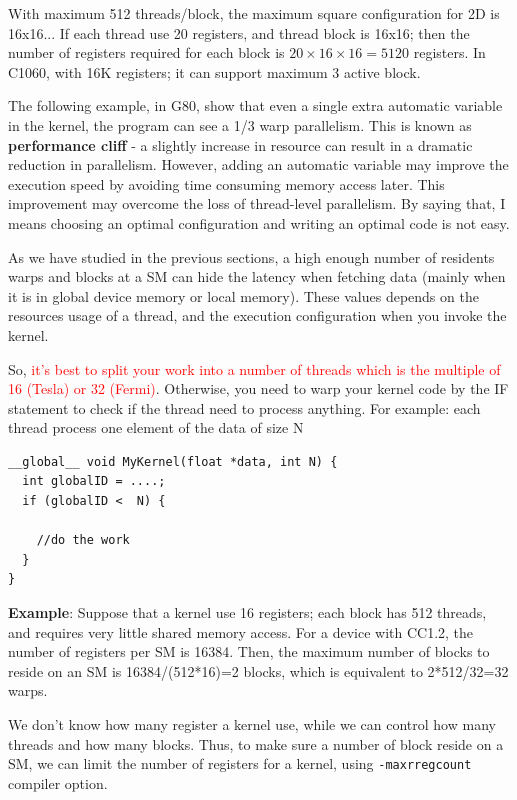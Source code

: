 \begin{framed}
  With maximum 512 threads/block, the maximum square configuration for
  2D is 16x16... If each thread use 20 registers, and thread block is
  16x16; then the number of registers required for each block is
  $20\times 16\times 16=5120$ registers. In C1060, with 16K registers;
  it can support maximum 3 active block.
\end{framed}

The following example, in G80, show that even a single extra automatic
variable in the kernel, the program can see a 1/3 warp
parallelism. This is known as {\bf performance cliff} - a slightly
increase in resource can result in a dramatic reduction in
parallelism. However, adding an automatic variable may improve the
execution speed by avoiding time consuming memory access later. This
improvement may overcome the loss of thread-level parallelism. By
saying that, I means choosing an optimal configuration and writing an
optimal code is not easy. 

As we have studied in the previous sections, a high enough number of
residents warps and blocks at a SM can hide the latency when fetching
data (mainly when it is in global device memory or local memory).
These values depends on the resources usage of a thread, and the
execution configuration when you invoke the kernel.


So,
\textcolor{red}{it's best to split your work into a number of threads
  which is the multiple of 16 (Tesla) or 32 (Fermi)}.
Otherwise, you need to warp your kernel code by the IF statement to
check if the thread need to process anything. For example: each thread
process one element of the data of size N
\begin{lstlisting}
__global__ void MyKernel(float *data, int N) {
  int globalID = ....;
  if (globalID <  N) {

    //do the work
  }
}
\end{lstlisting}

{\bf Example}: Suppose that a kernel use 16 registers; each block has
512 threads, and requires very little shared memory access. For a
device with CC1.2, the number of registers per SM is 16384. Then, the
maximum number of blocks to reside on an SM is 16384/(512*16)=2
blocks, which is equivalent to 2*512/32=32 warps.

We don't know how many register a kernel use, while we can control how
many threads and how many blocks. Thus, to make sure a number of block
reside on a SM, we can limit the number of registers for a kernel,
using \verb!-maxrregcount! compiler option.

